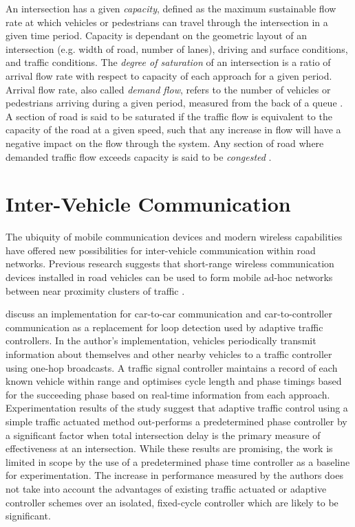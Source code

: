 \begin{appendices}
An intersection has a given \emph{capacity}, defined as the maximum sustainable flow rate at which vehicles or pedestrians can travel through the intersection in a given time period. Capacity is dependant on the geometric layout of an intersection (e.g. width of road, number of lanes), driving and surface conditions, and traffic conditions. The \emph{degree of saturation} of an intersection is a ratio of arrival flow rate with respect to capacity of each approach for a given period. Arrival flow rate, also called \emph{demand flow}, refers to the number of vehicles or pedestrians arriving during a given period, measured from the back of a queue \cite{sidraglossary}. A section of road is said to be saturated if the traffic flow is equivalent to the capacity of the road at a given speed, such that any increase in flow will have a negative impact on the flow through the system. Any section of road where demanded traffic flow exceeds capacity is said to be \emph{congested} \cite{wallis2013costs}.

\chapter{Inter-Vehicle Communication}

The ubiquity of mobile communication devices and modern wireless capabilities have offered new possibilities for inter-vehicle communication within road networks. Previous research suggests that short-range wireless communication devices installed in road vehicles can be used to form mobile ad-hoc networks between near proximity clusters of traffic \cite{adaptive2007grad,nadeem2004trafficview,yang2004vehicle}.

 discuss an implementation for car-to-car communication and car-to-controller communication as a replacement for loop detection used by adaptive traffic controllers. In the author's implementation, vehicles periodically transmit information about themselves and other nearby vehicles to a traffic controller using one-hop broadcasts. A traffic signal controller maintains a record of each known vehicle within range and optimises cycle length and phase timings based for the succeeding phase based on real-time information from each approach. Experimentation results of the study suggest that adaptive traffic control using a simple traffic actuated method out-performs a predetermined phase controller by a significant factor when total intersection delay is the primary measure of effectiveness at an intersection. While these results are promising, the work is limited in scope by the use of a predetermined phase time controller as a baseline for experimentation. The increase in performance measured by the authors does not take into account the advantages of existing traffic actuated or adaptive controller schemes over an isolated, fixed-cycle controller which are likely to be significant. 


\end{appendices}
